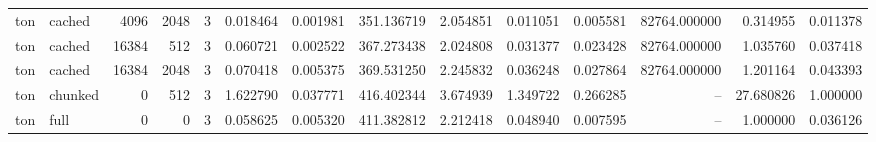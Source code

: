 \begin{tabular}{llrrrrrrrrrrrr}
ton & cached & 4096 & 2048 & 3 & 0.018464 & 0.001981 & 351.136719 & 2.054851 & 0.011051 & 0.005581 & 82764.000000 & 0.314955 & 0.011378 \\
ton & cached & 16384 & 512 & 3 & 0.060721 & 0.002522 & 367.273438 & 2.024808 & 0.031377 & 0.023428 & 82764.000000 & 1.035760 & 0.037418 \\
ton & cached & 16384 & 2048 & 3 & 0.070418 & 0.005375 & 369.531250 & 2.245832 & 0.036248 & 0.027864 & 82764.000000 & 1.201164 & 0.043393 \\
ton & chunked & 0 & 512 & 3 & 1.622790 & 0.037771 & 416.402344 & 3.674939 & 1.349722 & 0.266285 & -- & 27.680826 & 1.000000 \\
ton & full & 0 & 0 & 3 & 0.058625 & 0.005320 & 411.382812 & 2.212418 & 0.048940 & 0.007595 & -- & 1.000000 & 0.036126 \\
\bottomrule
\end{tabular}
